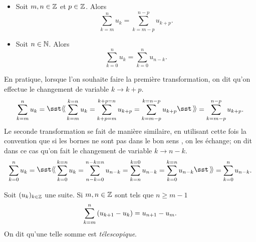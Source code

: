 \documentclass{magnoliaold}
\begin{document}
\begin{proposition}[utile=-3]
\begin{itemize}
\item Soit $m,n\in\mathbb{Z}$ et $p\in\mathbb{Z}$. Alors
  \[\sum_{k=m}^n u_k=\sum_{k=m-p}^{n-p} u_{k+p}.\]
\item Soit $n\in\mathbb{N}$. Alors
  \[\sum_{k=0}^n u_k=\sum_{k=0}^n u_{n-k}.\]
\end{itemize}
\end{proposition}

\begin{remarques}
\remarque En pratique, lorsque l'on souhaite faire la première transformation,
  on dit qu'on effectue le changement de variable $k\to k+p$.
  \[\sum_{k=m}^n u_k=\text{\og} \sum_{k=m}^{k=n} u_k=\sum_{k+p=m}^{k+p=n} u_{k+p}=
    \sum_{k=m-p}^{k=n-p} u_{k+p}\text{\fg}=\sum_{k=m-p}^{n-p} u_{k+p}.\]
  Le seconde transformation se fait de manière similaire, en utilisant cette fois la
  convention que si les bornes ne sont pas \og dans le bon sens \fg, on les échange; on
  dit dans ce cas qu'on fait le changement de variable $k\to n-k$.
  \[\sum_{k=0}^n u_k=\text{\og} \sum_{k=0}^{k=n} u_k=\sum_{n-k=0}^{n-k=n} u_{n-k}=
  \sum_{k=n}^{k=0} u_{n-k}=\sum_{k=0}^{k=n} u_{n-k}\text{\fg}=\sum_{k=0}^{n} u_{n-k}.\]

\remarque Soit $(u_k)_{k\in\mathbb{Z}}$ une suite. Si $m,n\in\mathbb{Z}$ sont tels que $n\geq m-1$
  \[\sum_{k=m}^n \left(u_{k+1} - u_k\right) = u_{n+1}-u_m.\]
  On dit qu'une telle somme est \emph{télescopique}.
\end{remarques}
\end{document}

